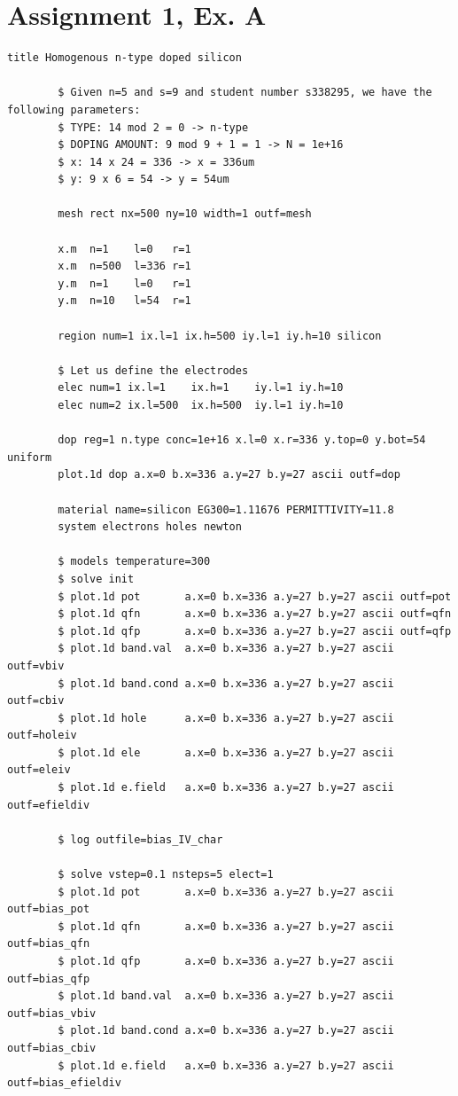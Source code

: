 \documentclass{book}
\begin{document}
        \section*{Assignment 1, Ex. A}
        \begin{Verbatim}[gobble=4]
        title Homogenous n-type doped silicon

        $ Given n=5 and s=9 and student number s338295, we have the following parameters:
        $ TYPE: 14 mod 2 = 0 -> n-type
        $ DOPING AMOUNT: 9 mod 9 + 1 = 1 -> N = 1e+16
        $ x: 14 x 24 = 336 -> x = 336um
        $ y: 9 x 6 = 54 -> y = 54um

        mesh rect nx=500 ny=10 width=1 outf=mesh

        x.m  n=1    l=0   r=1
        x.m  n=500  l=336 r=1
        y.m  n=1    l=0   r=1
        y.m  n=10   l=54  r=1

        region num=1 ix.l=1 ix.h=500 iy.l=1 iy.h=10 silicon

        $ Let us define the electrodes
        elec num=1 ix.l=1    ix.h=1    iy.l=1 iy.h=10
        elec num=2 ix.l=500  ix.h=500  iy.l=1 iy.h=10

        dop reg=1 n.type conc=1e+16 x.l=0 x.r=336 y.top=0 y.bot=54 uniform
        plot.1d dop a.x=0 b.x=336 a.y=27 b.y=27 ascii outf=dop

        material name=silicon EG300=1.11676 PERMITTIVITY=11.8
        system electrons holes newton

        $ models temperature=300 
        $ solve init
        $ plot.1d pot       a.x=0 b.x=336 a.y=27 b.y=27 ascii outf=pot
        $ plot.1d qfn       a.x=0 b.x=336 a.y=27 b.y=27 ascii outf=qfn
        $ plot.1d qfp       a.x=0 b.x=336 a.y=27 b.y=27 ascii outf=qfp
        $ plot.1d band.val  a.x=0 b.x=336 a.y=27 b.y=27 ascii outf=vbiv
        $ plot.1d band.cond a.x=0 b.x=336 a.y=27 b.y=27 ascii outf=cbiv
        $ plot.1d hole      a.x=0 b.x=336 a.y=27 b.y=27 ascii outf=holeiv
        $ plot.1d ele       a.x=0 b.x=336 a.y=27 b.y=27 ascii outf=eleiv
        $ plot.1d e.field   a.x=0 b.x=336 a.y=27 b.y=27 ascii outf=efieldiv

        $ log outfile=bias_IV_char

        $ solve vstep=0.1 nsteps=5 elect=1
        $ plot.1d pot       a.x=0 b.x=336 a.y=27 b.y=27 ascii outf=bias_pot
        $ plot.1d qfn       a.x=0 b.x=336 a.y=27 b.y=27 ascii outf=bias_qfn
        $ plot.1d qfp       a.x=0 b.x=336 a.y=27 b.y=27 ascii outf=bias_qfp
        $ plot.1d band.val  a.x=0 b.x=336 a.y=27 b.y=27 ascii outf=bias_vbiv
        $ plot.1d band.cond a.x=0 b.x=336 a.y=27 b.y=27 ascii outf=bias_cbiv
        $ plot.1d e.field   a.x=0 b.x=336 a.y=27 b.y=27 ascii outf=bias_efieldiv


\end{Verbatim}
\end{document}
